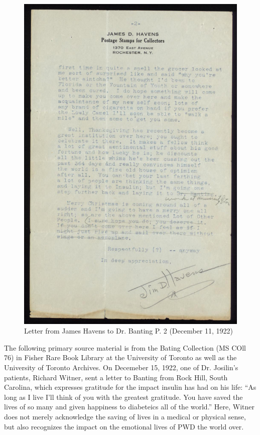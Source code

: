 \documentclass[12pt]{article}
\begin{document}
\begin{figure}[H]
\centering
  \includegraphics [width=5in]{thankshavep2}
  \caption{Letter from James Havens to Dr. Banting P. 2 (December 11, 1922)}
  \label{fig: Thanksgiving Letter P. 2}
\end{figure}

The following primary source material is from the Bating Collection (MS COll 76) in Fisher Rare Book Library at the University of Toronto as well as the University of Toronto Archives. 
On Decemeber 15, 1922, one of Dr. Josilin's patients, Richard Witner, sent a letter to Banting from Rock Hill, South Carolina, which expresses gratitude for the impact insulin has had on his life:
``As long as I live I'll think of you with the greatest gratitude. You have saved the lives of so many and given happiness to diabeteics all of the world.''
Here, Witner does not merely acknowledge the saving of lives in a medical or physical sense, but also recognizes the impact on the emotional lives of PWD the world over. 
\end{document}
